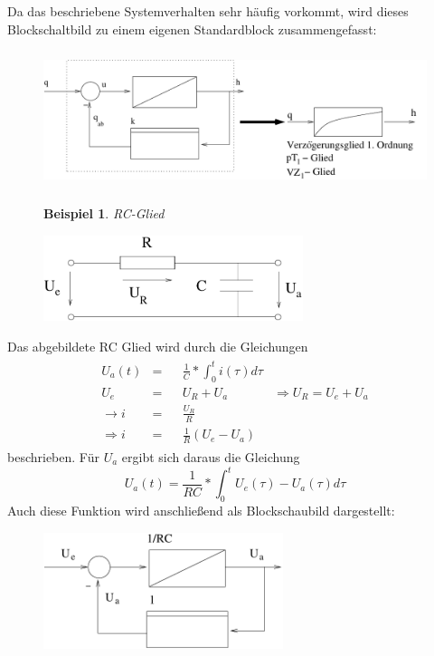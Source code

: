 \documentclass[12pt,a4paper,ngerman]{scrartcl}
\newtheorem{bsp}{Beispiel}[section] %
\begin{document}
Da das beschriebene Systemverhalten sehr häufig vorkommt, wird dieses Blockschaltbild zu einem eigenen Standardblock zusammengefasst:
\begin{figure}[H]
\includegraphics[height=4cm]{sysregel_pt1}
\end{figure}
\begin{figure}[H]
\begin{bsp}
RC-Glied
\end{bsp}

\includegraphics[height=2.5cm]{sysregel_RC}
\end{figure}
Das abgebildete RC Glied wird durch die Gleichungen
\begin{align*}
  \begin{array}{lrlll}
  U_a(t)&=&&\frac{1}{C}*\int_0^t{i(\tau)d\tau}\\
  U_e&=&&U_R+U_a &\Rightarrow U_R=U_e+U_a\\
  \rightarrow i&=&&\frac{U_R}{R}\\
  \Rightarrow i&=&&\frac{1}{R}(U_e-U_a)
 \end{array}
\end{align*}
beschrieben. Für $U_a$ ergibt sich daraus die Gleichung
\begin{equation*}
  U_a(t)=\frac{1}{RC}*\int_0^t{U_e(\tau)-U_a(\tau)d\tau}
\end{equation*}
Auch diese Funktion wird anschließend als Blockschaubild dargestellt:
\begin{figure}[H]
\includegraphics[width=7cm]{sysregel_bsb3}
\end{figure}
\end{document}
